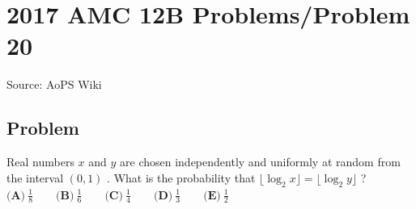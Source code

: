 \documentclass[12pt]{article}
\begin{document}
\section*{{2017 AMC 12B Problems/Problem 20}}
Source: AoPS Wiki

\subsection*{Problem}
Real numbers $x$ and $y$ are chosen independently and uniformly at random from the interval $(0,1)$ . What is the probability that $\lfloor\log_2x\rfloor=\lfloor\log_2y\rfloor$ ? $\textbf{(A)}\ \frac{1}{8}\qquad\textbf{(B)}\ \frac{1}{6}\qquad\textbf{(C)}\ \frac{1}{4}\qquad\textbf{(D)}\ \frac{1}{3}\qquad\textbf{(E)}\ \frac{1}{2}$
\end{document}

